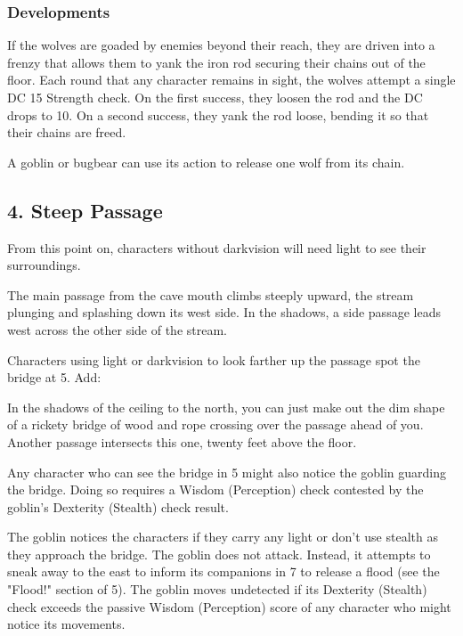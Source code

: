 \documentclass[10pt,a4paper,twoside,bg=print,twocolumn,openany,nodeprecatedcode]{dndbook}
\begin{document}
\subsubsection{Developments}
If the wolves are goaded by enemies beyond their reach, they are driven into a frenzy that allows them to yank the iron rod securing their chains out of the floor. Each round that any character remains in sight, the wolves attempt a single DC 15 Strength check. On the first success, they loosen the rod and the DC drops to 10. On a second success, they yank the rod loose, bending it so that their chains are freed.

A goblin or bugbear can use its action to release one wolf from its chain.

\subsection{4. Steep Passage}
From this point on, characters without darkvision will need light to see their surroundings.

\begin{DndReadAloud}{}
The main passage from the cave mouth climbs steeply upward, the stream plunging and splashing down its west side. In the shadows, a side passage leads west across the other side of the stream.

\end{DndReadAloud}

Characters using light or darkvision to look farther up the passage spot the bridge at 5. Add:

\begin{DndReadAloud}{}
In the shadows of the ceiling to the north, you can just make out the dim shape of a rickety bridge of wood and rope crossing over the passage ahead of you. Another passage intersects this one, twenty feet above the floor.

\end{DndReadAloud}

Any character who can see the bridge in 5 might also notice the goblin guarding the bridge. Doing so requires a Wisdom (Perception) check contested by the goblin's Dexterity (Stealth) check result.

The goblin notices the characters if they carry any light or don't use stealth as they approach the bridge. The goblin does not attack. Instead, it attempts to sneak away to the east to inform its companions in 7 to release a flood (see the "Flood!" section of 5). The goblin moves undetected if its Dexterity (Stealth) check exceeds the passive Wisdom (Perception) score of any character who might notice its movements.
\end{document}
